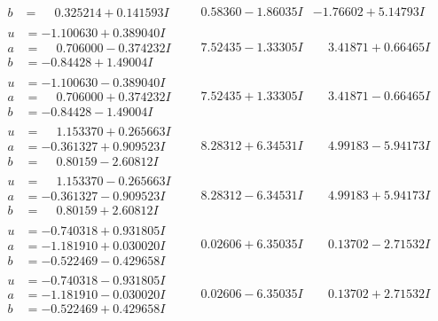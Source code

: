\documentclass[1p]{elsarticle_modified}
\theoremstyle{definition}
\begin{document}
$$\begin{array}{c|c|c}
\begin{aligned}
b &= \phantom{-}0.325214 + 0.141593 I\end{aligned}
 & \phantom{-}0.58360 - 1.86035 I & -1.76602 + 5.14793 I \\ \hline\begin{aligned}
u &= -1.100630 + 0.389040 I \\
a &= \phantom{-}0.706000 - 0.374232 I \\
b &= -0.84428 + 1.49004 I\end{aligned}
 & \phantom{-}7.52435 - 1.33305 I & \phantom{-}3.41871 + 0.66465 I \\ \hline\begin{aligned}
u &= -1.100630 - 0.389040 I \\
a &= \phantom{-}0.706000 + 0.374232 I \\
b &= -0.84428 - 1.49004 I\end{aligned}
 & \phantom{-}7.52435 + 1.33305 I & \phantom{-}3.41871 - 0.66465 I \\ \hline\begin{aligned}
u &= \phantom{-}1.153370 + 0.265663 I \\
a &= -0.361327 + 0.909523 I \\
b &= \phantom{-}0.80159 - 2.60812 I\end{aligned}
 & \phantom{-}8.28312 + 6.34531 I & \phantom{-}4.99183 - 5.94173 I \\ \hline\begin{aligned}
u &= \phantom{-}1.153370 - 0.265663 I \\
a &= -0.361327 - 0.909523 I \\
b &= \phantom{-}0.80159 + 2.60812 I\end{aligned}
 & \phantom{-}8.28312 - 6.34531 I & \phantom{-}4.99183 + 5.94173 I \\ \hline\begin{aligned}
u &= -0.740318 + 0.931805 I \\
a &= -1.181910 + 0.030020 I \\
b &= -0.522469 - 0.429658 I\end{aligned}
 & \phantom{-}0.02606 + 6.35035 I & \phantom{-}0.13702 - 2.71532 I \\ \hline\begin{aligned}
u &= -0.740318 - 0.931805 I \\
a &= -1.181910 - 0.030020 I \\
b &= -0.522469 + 0.429658 I\end{aligned}
 & \phantom{-}0.02606 - 6.35035 I & \phantom{-}0.13702 + 2.71532 I \\ \hline\begin{aligned}

\end{aligned}
\end{array}$$
\end{document}
